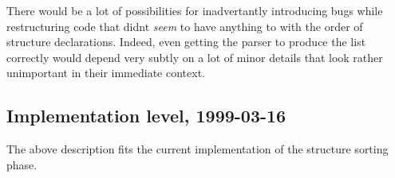 \begin{docpart}
There would be a lot of possibilities for inadvertantly introducing bugs
while restructuring code that didnt \emph{seem} to have anything to
with the order of structure declarations. Indeed, even getting the
parser to produce the list correctly would depend very subtly on a
lot of minor details that look rather unimportant in their immediate
context.

\subsection{Implementation level, 1999-03-16}

The above description fits the current implementation of the structure
sorting phase.

\end{docpart}

